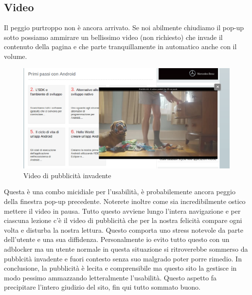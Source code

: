 \subsection{Video}

Il peggio purtroppo non è ancora arrivato. Se noi abilmente chiudiamo il pop-up sotto possiamo ammirare un bellissimo video (non richiesto) che invade il contenuto della pagina e che parte tranquillamente in automatico anche con il volume.


\begin{figure}[H]
\centering
\includegraphics[width=120mm]{images/adv5.png}
\caption{Video di pubblicità invadente}
\end{figure}

Questa è una combo micidiale per l'usabilità, è probabilemente ancora peggio della finestra pop-up precedente. Noterete inoltre come sia incredibilmente ostico mettere il video in pausa.
\linebreak
\linebreak
Tutto questo avviene lungo l'intera navigazione e per ciascuna lezione c'è il video di pubblicità che per la nostra felicità compare ogni volta e disturba la nostra lettura. Questo comporta uno stress notevole da parte dell'utente e una sua diffidenza. Personalmente io evito tutto questo con un adblocker ma un utente normale in questa situazione si ritroverebbe sommerso da pubblcità invadente e fuori contesto senza suo malgrado poter porre rimedio.
\linebreak
\linebreak
In conclusione, la pubblicità è lecita e comprensibile ma questo sito la gestisce in modo pessimo ammazzando letteralmente l'usabilità. Questo aspetto fa precipitare l'intero giudizio del sito, fin qui tutto sommato buono.

